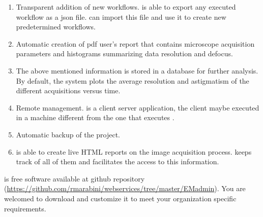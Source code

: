 \begin{enumerate}
 \item Transparent addition of new workflows. \scipion is able to export any executed workflow as a json file. \emadmin can import this file and use it to create new predetermined workflows.
 \item  Automatic creation of pdf user's report that contains microscope acquisition parameters and histograms summarizing data resolution and defocus. 
 \item The above mentioned information is stored in a database for further analysis. By default, the system plots the  average resolution and astigmatism of the different acquisitions versus time.
 \item Remote management. \emadmin is a client server application, the client maybe executed in a machine different from the one that executes \scipion.
 \item Automatic backup of the \scipion project.
 \item \scipion is able to create live HTML reports on the image acquisition process. \emadmin keeps track of all of them and facilitates the access to this information.
\end{enumerate}

\emadmin is free software available at github repository (\url{https://github.com/rmarabini/webservices/tree/master/EMadmin}). You are welcomed to download and customize it to meet your organization specific requirements.

